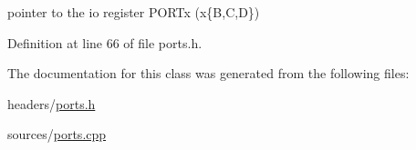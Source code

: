 pointer to the io register P\-O\-R\-Tx (x\{B,C,D\}) 



Definition at line 66 of file ports.\-h.



The documentation for this class was generated from the following files\-:\begin{DoxyCompactItemize}
\item 
headers/\hyperlink{ports_8h}{ports.\-h}\item 
sources/\hyperlink{ports_8cpp}{ports.\-cpp}\end{DoxyCompactItemize}
